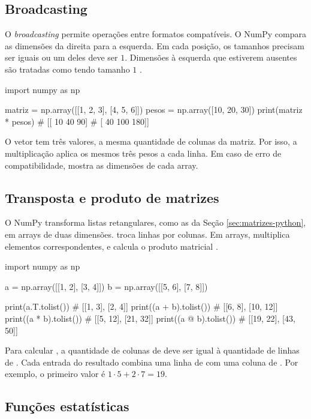 \subsection{Broadcasting}

O \emph{broadcasting} permite operações entre formatos compatíveis. O NumPy compara as dimensões da direita para a esquerda. Em cada posição, os tamanhos precisam ser iguais ou um deles deve ser \(1\). Dimensões à esquerda que estiverem ausentes são tratadas como tendo tamanho \(1\) \cite{numpy}.

\begin{exemplo}
import numpy as np

matriz = np.array([[1, 2, 3], [4, 5, 6]])
pesos = np.array([10, 20, 30])
print(matriz * pesos)
# [[ 10  40  90]
#  [ 40 100 180]]
\end{exemplo}

O vetor tem três valores, a mesma quantidade de colunas da matriz. Por isso, a multiplicação aplica os mesmos três pesos a cada linha. Em caso de erro de compatibilidade,  mostra as dimensões de cada array.

\subsection{Transposta e produto de matrizes}
\label{sec:matrizes-numpy}

O NumPy transforma listas retangulares, como as da Seção \ref{sec:matrizes-python}, em arrays de duas dimensões.  troca linhas por colunas. Em arrays,  multiplica elementos correspondentes, e  calcula o produto matricial \cite{numpy}.

\begin{exemplo}
import numpy as np

a = np.array([[1, 2], [3, 4]])
b = np.array([[5, 6], [7, 8]])

print(a.T.tolist())      # [[1, 3], [2, 4]]
print((a + b).tolist())  # [[6, 8], [10, 12]]
print((a * b).tolist())  # [[5, 12], [21, 32]]
print((a @ b).tolist())  # [[19, 22], [43, 50]]
\end{exemplo}

Para calcular , a quantidade de colunas de  deve ser igual à quantidade de linhas de . Cada entrada do resultado combina uma linha de  com uma coluna de . Por exemplo, o primeiro valor é \(1 \cdot 5 + 2 \cdot 7 = 19\).

\subsection{Funções estatísticas}

